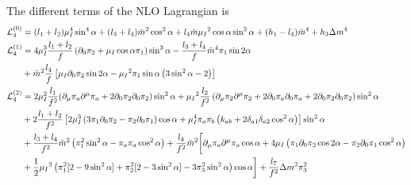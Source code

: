 The different terms of the NLO Lagrangian is
\begin{align}
    \Ell_4^{(0)} & =
    (l_1 + l_2)\mu_I^4 \sin^4{\alpha}
    + (l_3 + l_4)\bar m^2 \cos^2{\alpha}
    + l_4 \bar m \mu_I{}^2 \cos{\alpha} \sin^2{\alpha}
    + (h_1 - l_4)\bar m^4
    + h_3 \Delta m^4
    \label{NLO-L0}
    \\
    \nonumber
    \Ell_4^{(1)} & =
    4 \mu_I^3 \frac{l_1 + l_2}{f}
    \left(
        \partial_0 \pi_2 
        + \mu_I 
        \cos{\alpha} \pi_1
    \right)\sin^3{\alpha}
    -
    \frac{l_3 + l_4}{f}
    \bar m^4
    \pi_1 \sin{2\alpha}
    \\ \label{NLO-L1}
    & 
    +
    \bar m^2
    \frac{l_4}{f}
    \left[
        \mu_I 
        \partial_0 \pi_2 \sin{2\alpha}
        - \mu_I{}^2
        \pi_1 \sin{\alpha}
        \left(3\sin^2{\alpha} - 2\right)
    \right]
    \\
    \nonumber
    \Ell_4^{(2)} & = 
    2 \mu_I^2 \frac{l_1}{f^2}
    ( 
        \partial_\mu \pi_a \partial^\mu \pi_a
        + 2 \partial_0 \pi_2 \partial_0 \pi_2    
    )
        \sin^2{\alpha}
    + \mu_I{}^2 
    \frac{ l_2}{f^2}
    \left(
        \partial_\mu \pi_2 \partial^\mu \pi_2
        + 2\partial_0 \pi_a\partial_0 \pi_a 
        + 2\partial_0 \pi_2 \partial_0 \pi_2
    \right) 
    \sin^2{\alpha}
    \\ \nonumber
    & + 
    2 \frac{l_1 + l_2}{f^2}
    \left[
        2\mu_I^3 
        \left( 3 \pi_1 \partial_0 \pi_2 - \pi_2 \partial_0 \pi_1 \right)
        \cos{\alpha}
        + \mu_I^4  \pi_a \pi_b 
            \left(k_{ab} + 2\delta_{a1}\delta_{a2}\cos^2{\alpha} \right)
    \right]\sin^2{\alpha}
    \\ \nonumber
    & +
    \frac{l_3 + l_4}{f^2}
    \bar m^2
    \left(\pi_1^2 \sin^2{\alpha} - \pi_a \pi_a \cos^2{\alpha}\right)
    +  \frac{l_4}{f^2}
    \bar m^2
    \bigg[
    \partial_\mu \pi_a \partial^\mu \pi_a \cos{\alpha}
    + 4 \mu_I 
    \left(
        \pi_1 \partial_0 \pi_2 \cos{2\alpha}
        - \pi_2 \partial_0 \pi_1\cos^2{\alpha}
    \right)
    \\
    & %
    +\frac{1}{2} \mu_I{}^2
    \left(                
        \pi_1^2[2 - 9 \sin^2{\alpha}]
        + \pi_2^2 [2 - 3 \sin^2{\alpha}]
        - 3\pi_3^2\sin^2{\alpha}
    \right)
    \cos{\alpha}
    \bigg]
    + \frac{l_7}{f^2}
    \Delta m^2 \pi_3^2
    \label{NLO-L2}
\end{align}

